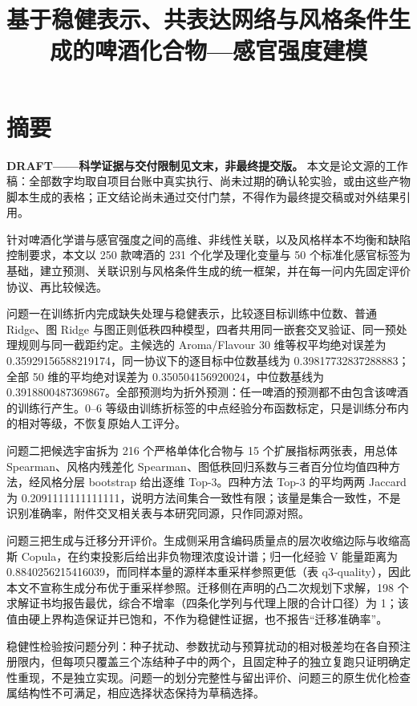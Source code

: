 \documentclass[11pt,a4paper]{article}
\title{基于稳健表示、共表达网络与风格条件生成的啤酒化合物---感官强度建模}
\author{}
\date{}
\newenvironment{draftbanner}{%
  \par\medskip\noindent
  \setlength{\fboxsep}{5pt}\setlength{\fboxrule}{0.4pt}%
  \begin{lrbox}{\bpDraftBox}%
  \begin{minipage}{\dimexpr\linewidth-2\fboxsep-2\fboxrule\relax}%
  \small\setlength{\parindent}{0pt}\setlength{\parskip}{0pt}%
  \raggedright
}{%
  \end{minipage}%
  \end{lrbox}%
  \noindent\fcolorbox{black!45}{yellow!8}{\usebox{\bpDraftBox}}%
  \par\medskip
}
\begin{document}
\maketitle
\thispagestyle{empty}
\section*{摘要}\label{ux6458ux8981}

\begin{draftbanner}
\textbf{DRAFT——科学证据与交付限制见文末，非最终提交版。} 本文是论文源的工作稿：全部数字均取自项目台账中真实执行、尚未过期的确认轮实验，或由这些产物脚本生成的表格；正文结论尚未通过交付门禁，不得作为最终提交稿或对外结果引用。
\end{draftbanner}

针对啤酒化学谱与感官强度之间的高维、非线性关联，以及风格样本不均衡和缺陷控制要求，本文以
250 款啤酒的 231 个化学及理化变量与 50
个标准化感官标签为基础，建立预测、关联识别与风格条件生成的统一框架，并在每一问内先固定评价协议、再比较候选。

问题一在训练折内完成缺失处理与稳健表示，比较逐目标训练中位数、普通
Ridge、图 Ridge
与图正则低秩四种模型，四者共用同一嵌套交叉验证、同一预处理规则与同一截距约定。主候选的
Aroma/Flavour 30 维等权平均绝对误差为
0.35929156588219174，同一协议下的逐目标中位数基线为
0.39817732837288883；全部 50 维的平均绝对误差为
0.350504156920024，中位数基线为
0.3918800487369867。全部预测均为折外预测：任一啤酒的预测都不由包含该啤酒的训练行产生。0--6
等级由训练折标签的中点经验分布函数标定，只是训练分布内的相对等级，不恢复原始人工评分。

问题二把候选宇宙拆为 216 个严格单体化合物与 15 个扩展指标两张表，用总体
Spearman、风格内残差化
Spearman、图低秩回归系数与三者百分位均值四种方法，经风格分层 bootstrap
给出逐维 Top-3。四种方法 Top-3 的平均两两 Jaccard 为
0.2091111111111111，说明方法间集合一致性有限；该量是集合一致性，不是识别准确率，附件交叉相关表与本研究同源，只作同源对照。

问题三把生成与迁移分开评价。生成侧采用含编码质量点的层次收缩边际与收缩高斯
Copula，在约束投影后给出非负物理浓度设计谱；归一化经验 V 能量距离为
0.8840256215416039，而同样本量的源样本重采样参照更低（表
q3-quality），因此本文不宣称生成分布优于重采样参照。迁移侧在声明的凸二次规划下求解，198
个求解证书均报告最优，综合不增率（四条化学列与代理上限的合计口径）为
1；该值由硬上界构造保证并已饱和，不作为稳健性证据，也不报告``迁移准确率''。

稳健性检验按问题分列：种子扰动、参数扰动与预算扰动的相对极差均在各自预注册限内，但每项只覆盖三个冻结种子中的两个，且固定种子的独立复跑只证明确定性重现，不是独立实现。问题一的划分完整性与留出评价、问题三的原生优化检查属结构性不可满足，相应选择状态保持为草稿选择。
\end{document}

